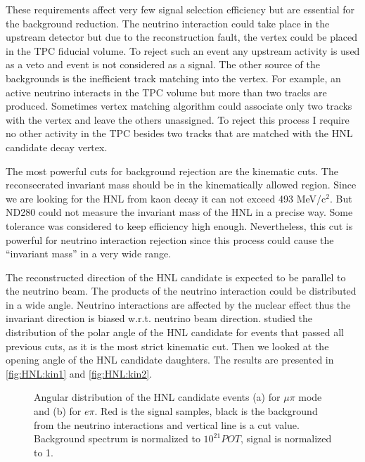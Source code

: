 \documentclass[../main.tex]{subfiles}
\begin{document}
These requirements affect very few signal selection efficiency but are essential for the background reduction. The neutrino interaction could take place in the upstream detector but due to the reconstruction fault, the vertex could be placed in the TPC fiducial volume. To reject such an event any upstream activity is used as a veto and event is not considered as a signal. The other source of the backgrounds is the inefficient track matching into the vertex. For example, an active neutrino interacts in the TPC volume but more than two tracks are produced. Sometimes vertex matching algorithm could associate only two tracks with the vertex and leave the others unassigned. To reject this process I require no other activity in the TPC besides two tracks that are matched with the HNL candidate decay vertex.

The most powerful cuts for background rejection are the kinematic cuts. The reconsecrated invariant mass should be in the kinematically allowed region. Since we are looking for the HNL from kaon decay it can not exceed 493 MeV/$\text{c}^2$. But ND280 could not measure the invariant mass of the HNL in a precise way. Some tolerance was considered to keep efficiency high enough. Nevertheless, this cut is powerful for neutrino interaction rejection since this process could cause the ``invariant mass'' in a very wide range.

The reconstructed direction of the HNL candidate is expected to be parallel to the neutrino beam. The products of the neutrino interaction could be distributed in a wide angle. Neutrino interactions are affected by the nuclear effect thus the invariant direction is biased w.r.t. neutrino beam direction. studied the distribution of the polar angle of the HNL candidate for events that passed all previous cuts, as it is the most strict kinematic cut. Then we looked at the opening angle of the HNL candidate daughters. The results are presented in \autoref{fig:HNL:kin1} and \autoref{fig:HNL:kin2}.

\begin{figure}[!ht]
  \begin{minipage}[h]{0.49\linewidth}
  \end{minipage}
  \hfill
  \begin{minipage}[h]{0.49\linewidth}
  \end{minipage}
  \caption{Angular distribution of the HNL candidate events (a) for $\mu\pi$ mode and (b) for $e\pi$. Red is the signal samples, black is the background from the neutrino interactions and vertical line is a cut value. Background spectrum is normalized to $10^{21}POT$, signal is normalized to 1.}
  \label{fig:HNL:kin1}
\end{figure}
\end{document}
